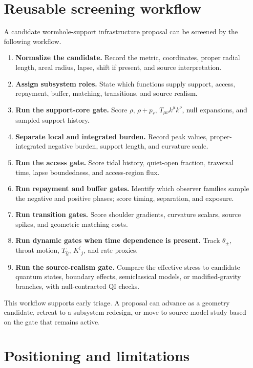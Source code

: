 \documentclass[11pt]{article}
\newcommand{\Tkk}{T_{\mu\nu}k^\mu k^\nu}
\begin{document}
\section{Reusable screening workflow}
\label{sec:workflow}

A candidate wormhole-support infrastructure proposal can be screened by the following workflow.

\begin{enumerate}
\item \textbf{Normalize the candidate.}  Record the metric, coordinates, proper radial length, areal radius, lapse, shift if present, and source interpretation.
\item \textbf{Assign subsystem roles.}  State which functions supply support, access, repayment, buffer, matching, transitions, and source realism.
\item \textbf{Run the support-core gate.}  Score $\rho$, $\rho+p_r$, $\Tkk$, null expansions, and sampled support history.
\item \textbf{Separate local and integrated burden.}  Record peak values, proper-integrated negative burden, support length, and curvature scale.
\item \textbf{Run the access gate.}  Score tidal history, quiet-open fraction, traversal time, lapse boundedness, and access-region flux.
\item \textbf{Run repayment and buffer gates.}  Identify which observer families sample the negative and positive phases; score timing, separation, and exposure.
\item \textbf{Run transition gates.}  Score shoulder gradients, curvature scalars, source spikes, and geometric matching costs.
\item \textbf{Run dynamic gates when time dependence is present.}  Track $\theta_\pm$, throat motion, $T_{\hat t\hat l}$, $K^i{}_j$, and rate proxies.
\item \textbf{Run the source-realism gate.}  Compare the effective stress to candidate quantum states, boundary effects, semiclassical models, or modified-gravity branches, with null-contracted QI checks.
\end{enumerate}

This workflow supports early triage.  A proposal can advance as a geometry candidate, retreat to a subsystem redesign, or move to source-model study based on the gate that remains active.

\section{Positioning and limitations}
\end{document}
